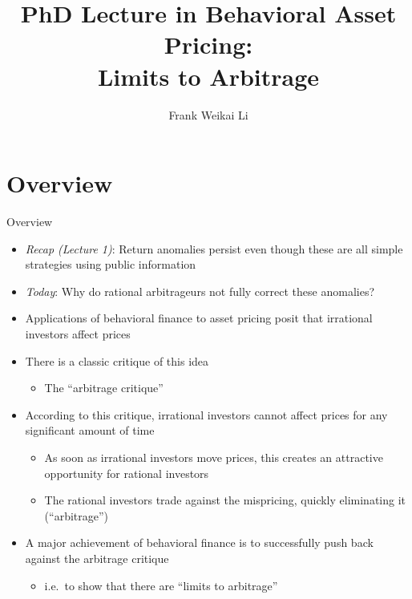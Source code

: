 \documentclass[aspectratio=169, 11pt]{beamer}
\title[EF8083 Lecture 2]{PhD Lecture in Behavioral Asset Pricing:\\ Limits to Arbitrage}
\author[F.\ W.\ Li]{Frank Weikai Li}
\institute[CityU]{Associate Professor of Finance\\City University of Hong Kong}
\date{}
\begin{document}

\begin{frame}[plain]
\titlepage
\end{frame}

\section{Overview}

\begin{frame}{Overview}
\begin{itemize}
\item \textit{Recap (Lecture 1)}: Return anomalies persist even though these are all simple strategies using public information
\item \textit{Today}: Why do rational arbitrageurs not fully correct these anomalies?
\item Applications of behavioral finance to asset pricing posit that irrational investors affect prices
\item There is a classic critique of this idea
  \begin{itemize}
  \item The ``arbitrage critique''
  \end{itemize}
\item According to this critique, irrational investors cannot affect prices for any significant amount of time
  \begin{itemize}
  \item As soon as irrational investors move prices, this creates an attractive opportunity for rational investors
  \item The rational investors trade against the mispricing, quickly eliminating it (``arbitrage'')
  \end{itemize}
\item A major achievement of behavioral finance is to successfully push back against the arbitrage critique
  \begin{itemize}
  \item i.e.\ to show that there are ``limits to arbitrage''
  \end{itemize}
\end{itemize}
\end{frame}
\end{document}
